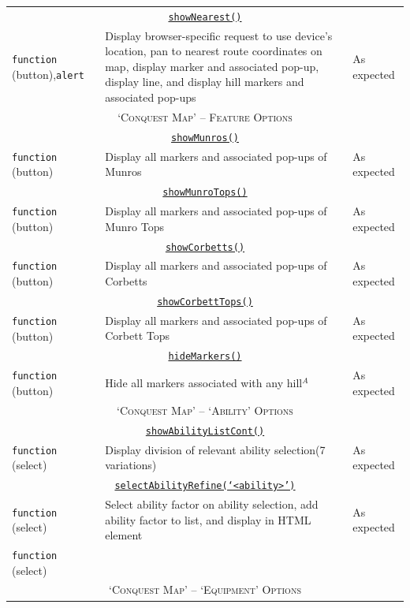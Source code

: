\documentclass[11pt, english]{article}
\begin{document}
\begin{center}
\begin{longtable}{p{3cm}p{8cm}p{2cm}}
		\multicolumn{3}{c}{\underline{\texttt{showNearest()}}}\\
		\texttt{function} (button),\newline \texttt{alert} & Display browser-specific request to use device's location, pan to nearest route coordinates on map, display marker and associated pop-up, display line, and display hill markers and associated pop-ups & As expected\\
		\hline
		\multicolumn{3}{c}{\textsc{`Conquest Map' -- Feature Options}}\\
		\hline
		\multicolumn{3}{c}{\underline{\texttt{showMunros()}}}\\
		\texttt{function} (button) & Display all markers and associated pop-ups of Munros & As expected\\
		\multicolumn{3}{c}{\underline{\texttt{showMunroTops()}}}\\
		\texttt{function} (button) & Display all markers and associated pop-ups of Munro Tops & As expected\\
		\multicolumn{3}{c}{\underline{\texttt{showCorbetts()}}}\\
		\texttt{function} (button) & Display all markers and associated pop-ups of Corbetts & As expected\\
		\multicolumn{3}{c}{\underline{\texttt{showCorbettTops()}}}\\
		\texttt{function} (button) & Display all markers and associated pop-ups of Corbett Tops & As expected\\
		\multicolumn{3}{c}{\underline{\texttt{hideMarkers()}}}\\
		\texttt{function} (button) & Hide all markers associated with any hill$^{A}$ & As expected\\
		\hline
		\multicolumn{3}{c}{\textsc{`Conquest Map' -- `Ability' Options}}\\
		\hline
		\multicolumn{3}{c}{\underline{\texttt{showAbilityListCont()}}}\\
		\texttt{function} (select) & Display division of relevant ability selection\newline (7 variations) & As expected\\
		\multicolumn{3}{c}{\underline{\texttt{selectAbilityRefine(`<ability>')}}}\\
		\texttt{function} (select) & Select ability factor on ability selection, add ability factor to list, and display in HTML element & As expected\\
		\texttt{function} (select)\\
		\hline
		\multicolumn{3}{c}{\textsc{`Conquest Map' -- `Equipment' Options}}\\

\end{longtable}
\end{center}
\end{document}

